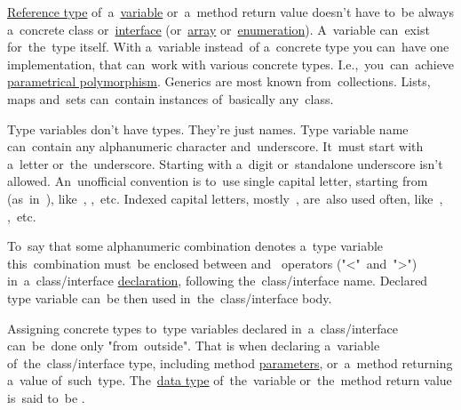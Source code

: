 \label{javagenerics}
\hyperref[javareferencetypes]{Reference type} of~a~\hyperref[variablefieldproperty]{variable} or~a~method return value doesn't have to~be always a~concrete class or~\hyperref[javainterfaces]{interface} (or~\hyperref[javaarray]{array} or~\hyperref[javaenum]{enumeration}).
A~variable can~exist for~the~type itself.
With a~variable instead~of a~concrete type you can~have one implementation, that can~work with various concrete types.
I.e.,~you~can~achieve \hyperref[polymorphism]{parametrical polymorphism}.
Generics are most known from~collections.
Lists, maps and~sets can~contain instances of~basically any~class.

Type variables don't have types.
They're just names.
Type variable name can~contain any alphanumeric character and~underscore.
It~must start with a~letter or~the~underscore.
Starting with a~digit or~standalone underscore isn't allowed.
An~unofficial convention is to~use single capital letter, starting \mbox{from } \mbox{(as in )}, \mbox{like }, \mbox{,  etc.}
Indexed capital letters, \mbox{mostly }, are~also used often, \mbox{like }, \mbox{,  etc.}

To~say that some alphanumeric combination denotes a~type variable this~combination must~be enclosed between  \mbox{and } operators \mbox{("<" and ">")} in~a~class/interface \hyperref[declarationdefinition]{declaration}, following the~class/interface name.
Declared type variable can~be then used in~the~class/interface body.

Assigning concrete types to~type variables declared in~a~class/interface can~be~done only \mbox{"from outside"}.
That is when declaring a~variable of~the~class/interface type, including method \hyperref[parameterargument]{parameters}, or~a~method returning a~value of~such~type.
The~\hyperref[datatypes]{data type} of~the~variable or~the~method return value is~said to~be .
\newpage

